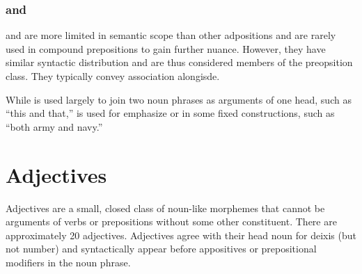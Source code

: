 \subsection{ and } \label{subsec:u_and_su}
 and  are more limited in semantic scope than other adpositions and are rarely used in compound prepositions to gain further nuance. However, they have similar syntactic distribution and are thus considered members of the preopsition class. They typically convey association alongisde.

While  is used largely to join two noun phrases as arguments of one head, such as  “this and that,”  is used for emphasize or in some fixed constructions, such as  “both army and navy.”




\setchapterpreamble[u]{\margintoc}
\chapter{Adjectives}
Adjectives are a small, closed class of noun-like morphemes that cannot be arguments of verbs or prepositions without some other constituent. There are approximately 20 adjectives. Adjectives agree with their head noun for deixis (but not number) and syntactically appear before appositives or prepositional modifiers in the noun phrase.

